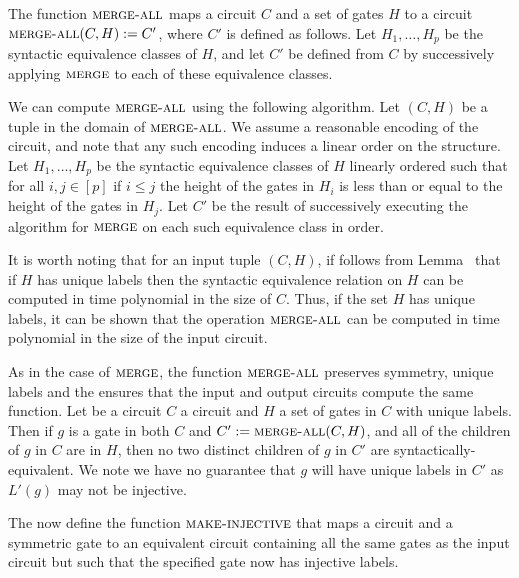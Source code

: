 \documentclass[../paper.tex]{subfiles}
\begin{document}
\begin{definition}
  \label{def:merge-all}
  The function ${\normalfont\textsc{merge-all}}$ maps a circuit $C$ and a set of gates $H$ to a
  circuit ${\normalfont\textsc{merge-all}}(C, H) := C'$, where $C'$ is defined as follows. Let
  $H_1, \ldots, H_p$ be the syntactic equivalence classes of $H$, and let $C'$
  be defined from $C$ by successively applying ${\normalfont\textsc{merge}}$ to each of these
  equivalence classes.
\end{definition}

We can compute ${\normalfont\textsc{merge-all}}$ using the following algorithm. Let $(C, H)$ be a
tuple in the domain of ${\normalfont\textsc{merge-all}}$. We assume a reasonable encoding of the
circuit, and note that any such encoding induces a linear order on the
structure. Let $H_1, \ldots, H_p$ be the syntactic equivalence classes of $H$
linearly ordered such that for all $i, j \in [p]$ if $i \leq j$ the height of
the gates in $H_i$ is less than or equal to the height of the gates in $H_j$.
Let $C'$ be the result of successively executing the algorithm for ${\normalfont\textsc{merge}}$
on each such equivalence class in order.

It is worth noting that for an input tuple $(C, H)$, if follows from
Lemma~\cite{lem:unique-labels-syntactic-equiv} that if $H$ has unique labels
then the syntactic equivalence relation on $H$ can be computed in time
polynomial in the size of $C$. Thus, if the set $H$ has unique labels, it can be
shown that the operation ${\normalfont\textsc{merge-all}}$ can be computed in time polynomial in
the size of the input circuit.

As in the case of ${\normalfont\textsc{merge}}$, the function ${\normalfont\textsc{merge-all}}$ preserves
symmetry, unique labels and the ensures that the input and output circuits
compute the same function. Let be a circuit $C$ a circuit and $H$ a set of gates
in $C$ with unique labels. Then if $g$ is a gate in both $C$ and $C' :=
{\normalfont\textsc{merge-all}}(C, H)$, and all of the children of $g$ in $C$ are in $H$, then no
two distinct children of $g$ in $C'$ are syntactically-equivalent. We note we
have no guarantee that $g$ will have unique labels in $C'$ as $L'(g)$ may not be
injective.


The now define the function ${\normalfont\textsc{make-injective}}$ that maps a circuit and a
symmetric gate to an equivalent circuit containing all the same gates as the
input circuit but such that the specified gate now has injective labels.
\end{document}
